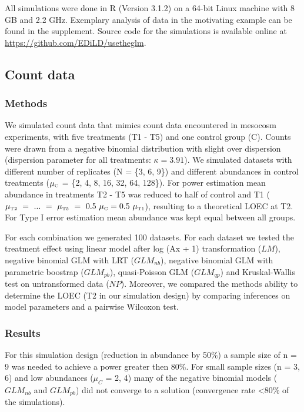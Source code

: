 \documentclass{scrartcl}
\begin{document}
All simulations were done in R (Version 3.1.2) on a 64-bit Linux machine with 8 GB and 2.2 GHz.
Exemplary analysis of data in the motivating example can be found in the supplement.
Source code for the simulations is available online at \url{https://github.com/EDiLD/usetheglm}. 

\subsection{Count data}
\subsubsection{Methods}
We simulated count data that mimics count data encountered in mesocosm experiments, with five treatments (T1 - T5) and one control group (C).
Counts were drawn from a negative binomial distribution with slight over dispersion (dispersion parameter for all treatments: $\kappa = 3.91$).
We simulated datasets with different number of replicates (N = \{3, 6, 9\}) and different abundances in control treatments ($\mu_\text{\tiny C}$ = \{2, 4, 8, 16, 32, 64, 128\}). 
For power estimation mean abundance in treatments T2 - T5 was reduced to half of control and T1 ($\mu_\text{\tiny T2}~=~...~=~\mu_\text{\tiny T5}~=~0.5~\mu_\text{\tiny C} = 0.5~\mu_\text{\tiny T1}$), resulting to a theoretical LOEC at T2.
For Type I error estimation mean abundance was kept equal between all groups.

For each combination we generated 100 datasets. 
For each dataset we tested the treatment effect using linear model after log (Ax + 1) transformation ($LM$), negative binomial GLM with LRT ($GLM_{nb}$), negative binomial GLM with parametric boostrap ($GLM_{pb}$), quasi-Poisson GLM ($GLM_{qp}$) and Kruskal-Wallis test on untransformed data ($NP$).
Moreover, we compared the methods ability to determine the LOEC (T2 in our simulation design) by comparing inferences on model parameters and a pairwise Wilcoxon test.

\subsubsection{Results}
For this simulation design (reduction in abundance by 50\%) a sample size of n = 9 was needed to achieve a power greater then 80\%.
For small sample sizes (n = {3, 6}) and low abundances ($\mu_C$ = {2, 4}) many of the negative binomial models ($GLM_{nb}$ and $GLM_{pb}$) did not converge to a solution (convergence rate \textless 80\% of the simulations). 
\end{document}
